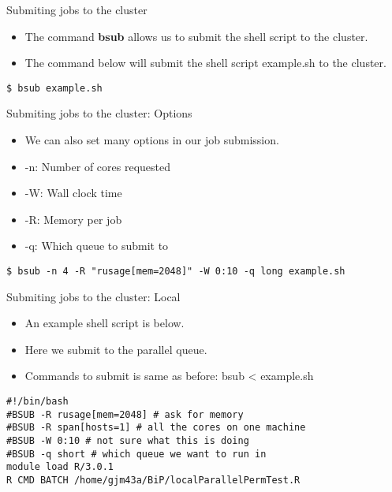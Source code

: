 \begin{frame}{Submiting jobs to the cluster}
\begin{itemize}
\item The command {\bf bsub} allows us to submit the shell script to the cluster. 
\item The command below will submit the shell script example.sh to the cluster.  
\end{itemize}
{\tt \$ bsub example.sh}
\end{frame}


\begin{frame}{Submiting jobs to the cluster: Options}
\begin{itemize}
\item We can also set many options in our job submission. 
\item -n: Number of cores requested
\item -W: Wall clock time
\item -R: Memory per job
\item -q: Which queue to submit to
\end{itemize}
{\tt \$ bsub -n 4 -R "rusage[mem=2048]" -W 0:10 -q long example.sh}
\end{frame}

\begin{frame}{Submiting jobs to the cluster: Local}
\begin{itemize}
\item An example shell script is below. 
\item Here we submit to the parallel queue.
\item Commands to submit is same as before: bsub < example.sh
\end{itemize}
{\tt \#!/bin/bash\\
\#BSUB -R rusage[mem=2048] \# ask for memory\\
\#BSUB -R span[hosts=1]    \# all the cores on one machine\\
\#BSUB -W 0:10             \# not sure what this is doing\\
\#BSUB -q short  \# which queue we want to run in\\

module load R/3.0.1\\
R CMD BATCH /home/gjm43a/BiP/localParallelPermTest.R}
\end{frame}

